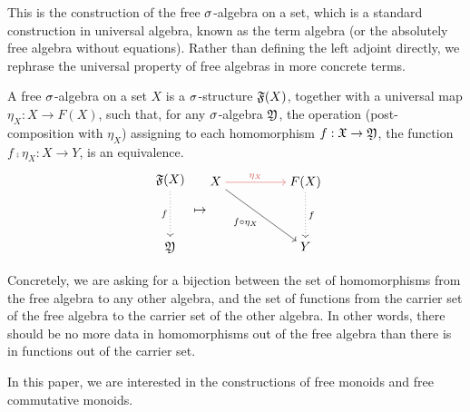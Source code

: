 This is the construction of the free $\sigma$-algebra on a set, which is a standard construction in universal algebra,
known as the term algebra (or the absolutely free algebra without equations).
%
Rather than defining the left adjoint directly, we rephrase the universal property of free algebras in more concrete
terms.

\begin{definition}
    A free $\sigma$-algebra on a set $X$ is a $\sigma$-structure $\mathfrak{F}(X)$,
    together with a universal map $\eta_X : X \to F(X)$, such that,
    for any $\sigma$-algebra $\mathfrak{Y}$, the operation (post-composition with $\eta_X$)
    assigning to each homomorphism $f : \mathfrak{X} \to \mathfrak{Y}$, the function $f \comp \eta_X : X \to Y$,
    is an equivalence.
    \[
        \begin{tikzcd}[ampersand replacement=\&]
            \str{F}(X) \\
            \\
            \str{Y}
            \arrow["f"', dotted, from=1-1, to=3-1]
        \end{tikzcd}
        \mapsto
        \begin{tikzcd}[ampersand replacement=\&,cramped]
            X \&\& {F(X)} \\
            \\
            \&\& Y
            \arrow["{\eta_{X}}", color={rgb,255:red,214;green,92;blue,92}, from=1-1, to=1-3]
            \arrow["{f \comp \eta_{X}}"', from=1-1, to=3-3]
            \arrow["f", dotted, from=1-3, to=3-3]
        \end{tikzcd}
    \]
\end{definition}

Concretely, we are asking for a bijection between the set of homomorphisms from the free algebra to any other algebra,
and the set of functions from the carrier set of the free algebra to the carrier set of the other algebra.
%
In other words, there should be no more data in homomorphisms out of the free algebra than there is in functions out of
the carrier set.
%

In this paper, we are interested in the constructions of free monoids and free commutative monoids.